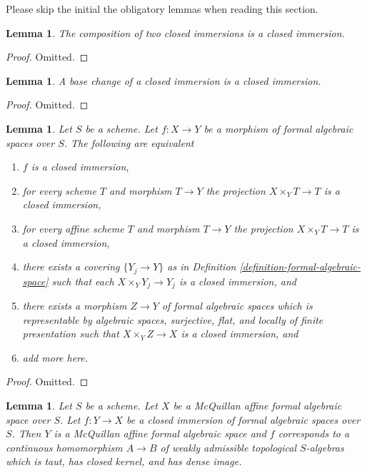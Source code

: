 \documentclass{stacks-project}
\theoremstyle{plain}
\newtheorem{lemma}[subsection]{Lemma}
\theoremstyle{definition}
\theoremstyle{remark}
\numberwithin{equation}{subsection}
\begin{document}
\noindent
Please skip the initial the obligatory lemmas when reading this section.

\begin{lemma}
\label{lemma-composition-closed-immersion}
The composition of two closed immersions is a closed immersion.
\end{lemma}

\begin{proof}
Omitted.
\end{proof}

\begin{lemma}
\label{lemma-base-change-closed-immersion}
A base change of a closed immersion is a closed immersion.
\end{lemma}

\begin{proof}
Omitted.
\end{proof}

\begin{lemma}
\label{lemma-characterize-closed-immersion}
Let $S$ be a scheme. Let $f : X \to Y$ be a morphism of formal algebraic
spaces over $S$. The following are equivalent
\begin{enumerate}
\item $f$ is a closed immersion,
\item for every scheme $T$ and morphism $T \to Y$ the projection
$X \times_Y T \to T$ is a closed immersion,
\item for every affine scheme $T$ and morphism $T \to Y$
the projection $X \times_Y T \to T$ is a closed immersion,
\item there exists a covering $\{Y_j \to Y\}$ as in
Definition \ref{definition-formal-algebraic-space}
such that each $X \times_Y Y_j \to Y_j$ is a closed immersion, and
\item there exists a morphism $Z \to Y$ of formal algebraic spaces
which is representable by algebraic spaces, surjective, flat, and locally
of finite presentation such that $X \times_Y Z \to X$ is a
closed immersion, and
\item add more here.
\end{enumerate}
\end{lemma}

\begin{proof}
Omitted.
\end{proof}

\begin{lemma}
\label{lemma-closed-immersion-into-McQuillan}
Let $S$ be a scheme. Let $X$ be a McQuillan affine formal algebraic space
over $S$. Let $f : Y \to X$ be a closed immersion of formal algebraic spaces
over $S$. Then $Y$ is a McQuillan affine formal algebraic space and
$f$ corresponds to a continuous homomorphism $A \to B$ of weakly admissible
topological $S$-algebras which is taut, has closed kernel, and has
dense image.
\end{lemma}
\end{document}
